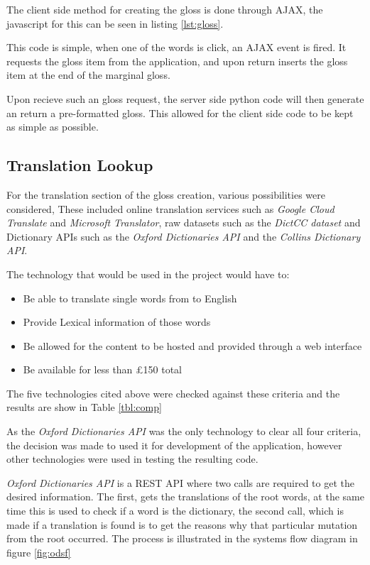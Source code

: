 The client side method for creating the gloss is done through AJAX, the javascript for this can be seen in listing \ref{lst:gloss}.



This code is simple, when one of the words is click, an AJAX event is fired. It requests the gloss item from the application, and upon return inserts the gloss item at the end of the marginal gloss.

Upon recieve such an gloss request, the server side python code will then generate an return a pre-formatted gloss. This allowed for the client side code to be kept as simple as possible.

\subsection{Translation Lookup}

For the translation section of the gloss creation, various possibilities were considered, These included online translation services such as \textit{Google Cloud Translate} and \textit{Microsoft Translator}, raw datasets such as the \textit{DictCC dataset} and Dictionary APIs such as the \textit{Oxford Dictionaries API} and the \textit{Collins Dictionary API}. 

The technology that would be used in the project would have to:
\begin{itemize}
\item Be able to translate single words from to English
\item Provide Lexical information of those words
\item Be allowed for the content to be hosted and provided through a web interface
\item Be available for less than \pounds150 total
\end{itemize}

The five technologies cited above were checked against these criteria and the results are show in Table \ref{tbl:comp}



As the \textit{Oxford Dictionaries API} was the only technology to clear all four criteria, the decision was made to used it for development of the application, however other technologies were used in testing the resulting code.

\textit{Oxford Dictionaries API} is a REST API where two calls are required to get the desired information. The first, gets the translations of the root words, at the same time this is used to check if a word is the dictionary, the second call, which is made if a translation is found is to get the reasons why that particular mutation from the root occurred.  The process is illustrated in the systems flow diagram in figure \ref{fig:odsf}

